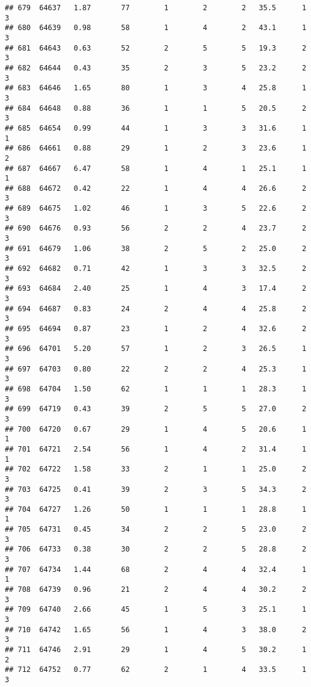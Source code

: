 \documentclass[
]{article}
\begin{document}
\begin{verbatim}
## 679  64637   1.87       77        1        2        2   35.5      1      3
## 680  64639   0.98       58        1        4        2   43.1      1      3
## 681  64643   0.63       52        2        5        5   19.3      2      3
## 682  64644   0.43       35        2        3        5   23.2      2      3
## 683  64646   1.65       80        1        3        4   25.8      1      3
## 684  64648   0.88       36        1        1        5   20.5      2      3
## 685  64654   0.99       44        1        3        3   31.6      1      1
## 686  64661   0.88       29        1        2        3   23.6      1      2
## 687  64667   6.47       58        1        4        1   25.1      1      1
## 688  64672   0.42       22        1        4        4   26.6      2      3
## 689  64675   1.02       46        1        3        5   22.6      2      3
## 690  64676   0.93       56        2        2        4   23.7      2      3
## 691  64679   1.06       38        2        5        2   25.0      2      3
## 692  64682   0.71       42        1        3        3   32.5      2      3
## 693  64684   2.40       25        1        4        3   17.4      2      3
## 694  64687   0.83       24        2        4        4   25.8      2      3
## 695  64694   0.87       23        1        2        4   32.6      2      3
## 696  64701   5.20       57        1        2        3   26.5      1      3
## 697  64703   0.80       22        2        2        4   25.3      1      3
## 698  64704   1.50       62        1        1        1   28.3      1      3
## 699  64719   0.43       39        2        5        5   27.0      2      3
## 700  64720   0.67       29        1        4        5   20.6      1      1
## 701  64721   2.54       56        1        4        2   31.4      1      1
## 702  64722   1.58       33        2        1        1   25.0      2      3
## 703  64725   0.41       39        2        3        5   34.3      2      3
## 704  64727   1.26       50        1        1        1   28.8      1      1
## 705  64731   0.45       34        2        2        5   23.0      2      3
## 706  64733   0.38       30        2        2        5   28.8      2      3
## 707  64734   1.44       68        2        4        4   32.4      1      1
## 708  64739   0.96       21        2        4        4   30.2      2      3
## 709  64740   2.66       45        1        5        3   25.1      1      3
## 710  64742   1.65       56        1        4        3   38.0      2      3
## 711  64746   2.91       29        1        4        5   30.2      1      2
## 712  64752   0.77       62        2        1        4   33.5      1      3

\end{verbatim}
\end{document}
